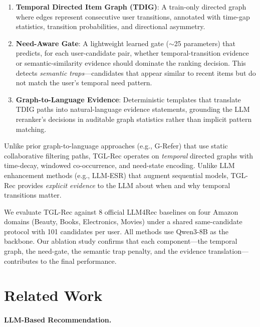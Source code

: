 \documentclass[10pt,twocolumn]{article}
\begin{document}
\begin{enumerate}
\item \textbf{Temporal Directed Item Graph (TDIG)}: A train-only directed graph where edges represent consecutive user transitions, annotated with time-gap statistics, transition probabilities, and directional asymmetry.

\item \textbf{Need-Aware Gate}: A lightweight learned gate ($\sim$25 parameters) that predicts, for each user-candidate pair, whether temporal-transition evidence or semantic-similarity evidence should dominate the ranking decision. This detects \emph{semantic traps}---candidates that appear similar to recent items but do not match the user's temporal need pattern.

\item \textbf{Graph-to-Language Evidence}: Deterministic templates that translate TDIG paths into natural-language evidence statements, grounding the LLM reranker's decisions in auditable graph statistics rather than implicit pattern matching.
\end{enumerate}

Unlike prior graph-to-language approaches (e.g., G-Refer) that use static collaborative filtering paths, TGL-Rec operates on \emph{temporal} directed graphs with time-decay, windowed co-occurrence, and need-state encoding. Unlike LLM enhancement methods (e.g., LLM-ESR) that augment sequential models, TGL-Rec provides \emph{explicit evidence} to the LLM about when and why temporal transitions matter.

We evaluate TGL-Rec against 8 official LLM4Rec baselines on four Amazon domains (Beauty, Books, Electronics, Movies) under a shared same-candidate protocol with 101 candidates per user. All methods use Qwen3-8B as the backbone. Our ablation study confirms that each component---the temporal graph, the need-gate, the semantic trap penalty, and the evidence translation---contributes to the final performance.

\section{Related Work}

\paragraph{LLM-Based Recommendation.}
\end{document}

